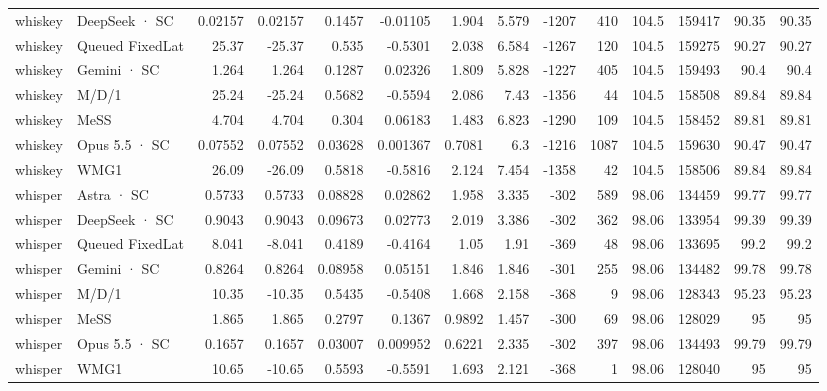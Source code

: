 \begin{tabular}{llrrrrrrrrrrrr}
whiskey & DeepSeek · SC & 0.02157 & 0.02157 & 0.1457 & -0.01105 & 1.904 & 5.579 & -1207 & 410 & 104.5 & 159417 & 90.35 & 90.35 \\
whiskey & Queued FixedLat & 25.37 & -25.37 & 0.535 & -0.5301 & 2.038 & 6.584 & -1267 & 120 & 104.5 & 159275 & 90.27 & 90.27 \\
whiskey & Gemini · SC & 1.264 & 1.264 & 0.1287 & 0.02326 & 1.809 & 5.828 & -1227 & 405 & 104.5 & 159493 & 90.4 & 90.4 \\
whiskey & M/D/1 & 25.24 & -25.24 & 0.5682 & -0.5594 & 2.086 & 7.43 & -1356 & 44 & 104.5 & 158508 & 89.84 & 89.84 \\
whiskey & MeSS & 4.704 & 4.704 & 0.304 & 0.06183 & 1.483 & 6.823 & -1290 & 109 & 104.5 & 158452 & 89.81 & 89.81 \\
whiskey & Opus 5.5 · SC & 0.07552 & 0.07552 & 0.03628 & 0.001367 & 0.7081 & 6.3 & -1216 & 1087 & 104.5 & 159630 & 90.47 & 90.47 \\
whiskey & WMG1 & 26.09 & -26.09 & 0.5818 & -0.5816 & 2.124 & 7.454 & -1358 & 42 & 104.5 & 158506 & 89.84 & 89.84 \\
whisper & Astra · SC & 0.5733 & 0.5733 & 0.08828 & 0.02862 & 1.958 & 3.335 & -302 & 589 & 98.06 & 134459 & 99.77 & 99.77 \\
whisper & DeepSeek · SC & 0.9043 & 0.9043 & 0.09673 & 0.02773 & 2.019 & 3.386 & -302 & 362 & 98.06 & 133954 & 99.39 & 99.39 \\
whisper & Queued FixedLat & 8.041 & -8.041 & 0.4189 & -0.4164 & 1.05 & 1.91 & -369 & 48 & 98.06 & 133695 & 99.2 & 99.2 \\
whisper & Gemini · SC & 0.8264 & 0.8264 & 0.08958 & 0.05151 & 1.846 & 1.846 & -301 & 255 & 98.06 & 134482 & 99.78 & 99.78 \\
whisper & M/D/1 & 10.35 & -10.35 & 0.5435 & -0.5408 & 1.668 & 2.158 & -368 & 9 & 98.06 & 128343 & 95.23 & 95.23 \\
whisper & MeSS & 1.865 & 1.865 & 0.2797 & 0.1367 & 0.9892 & 1.457 & -300 & 69 & 98.06 & 128029 & 95 & 95 \\
whisper & Opus 5.5 · SC & 0.1657 & 0.1657 & 0.03007 & 0.009952 & 0.6221 & 2.335 & -302 & 397 & 98.06 & 134493 & 99.79 & 99.79 \\
whisper & WMG1 & 10.65 & -10.65 & 0.5593 & -0.5591 & 1.693 & 2.121 & -368 & 1 & 98.06 & 128040 & 95 & 95 \\
\bottomrule
\end{tabular}
